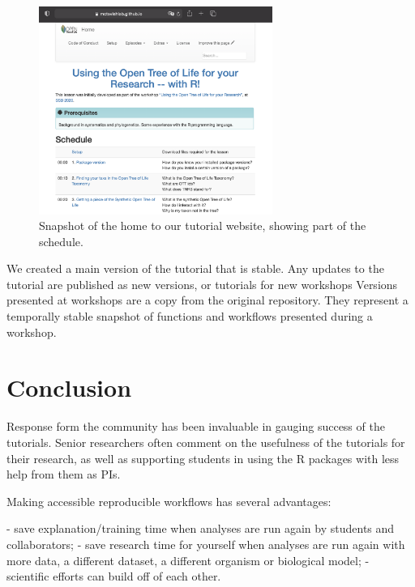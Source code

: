 \documentclass[12pt]{article}
\begin{document}
\begin{figure}
\begin{center}
\includegraphics[width=3in]{fig2.png}
\end{center}
\caption{Snapshot of the home to our tutorial website, showing part of the schedule. \label{fig:second}}
\end{figure}

We created a main version of the tutorial that is stable. Any updates to the tutorial are
published as new versions, or tutorials for new workshops \citep{CARPENTRIES}
 Versions presented at workshops are a copy from the original repository.
They represent a temporally stable snapshot of functions and workflows presented
during a workshop.


\section*{Conclusion}
\label{sec:conclusion}

Response form the community has been invaluable in gauging success of the tutorials.
Senior researchers often comment on the usefulness
of the tutorials for their research, as well as supporting students in using the
R packages with less help from them as PIs.

Making accessible reproducible workflows has several advantages:

- save explanation/training time when analyses are run again by students and collaborators;
- save research time for yourself when analyses are run again with more data, a
  different dataset, a different organism or biological model;
- scientific efforts can build off of each other.
\end{document}
